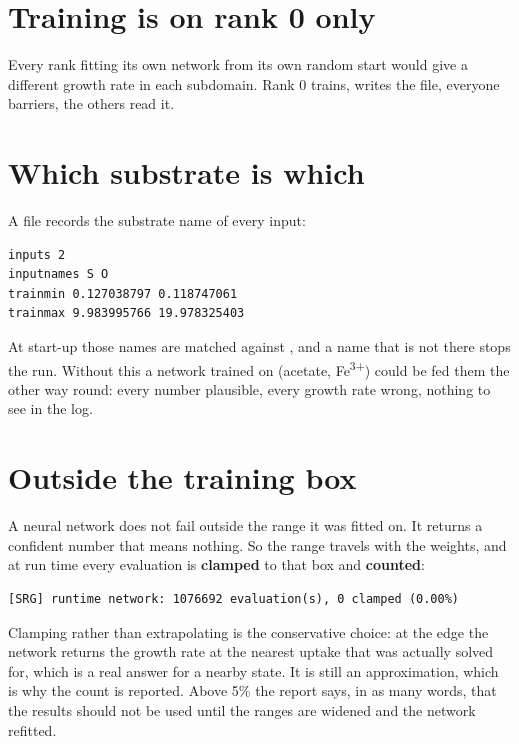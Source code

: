\section{Training is on rank 0 only}

Every rank fitting its own network from its own random start would give a
different growth rate in each subdomain. Rank 0 trains, writes the file,
everyone barriers, the others read it.

\section{Which substrate is which}

A  file records the substrate name of every input:

\begin{lstlisting}[style=sh]
inputs 2
inputnames S O
trainmin 0.127038797 0.118747061
trainmax 9.983995766 19.978325403
\end{lstlisting}

At start-up those names are matched against , and a
name that is not there stops the run. Without this a network trained on
(acetate, Fe\textsuperscript{3+}) could be fed them the other way round: every
number plausible, every growth rate wrong, nothing to see in the log.


\section{Outside the training box}

A neural network does not fail outside the range it was fitted on. It returns
a confident number that means nothing. So the range travels with the weights,
and at run time every evaluation is \textbf{clamped} to that box and
\textbf{counted}:

\begin{lstlisting}[style=sh]
[SRG] runtime network: 1076692 evaluation(s), 0 clamped (0.00%)
\end{lstlisting}

Clamping rather than extrapolating is the conservative choice: at the edge the
network returns the growth rate at the nearest uptake that was actually solved
for, which is a real answer for a nearby state. It is still an approximation,
which is why the count is reported. Above 5\% the report says, in as many
words, that the results should not be used until the ranges are widened and
the network refitted.

